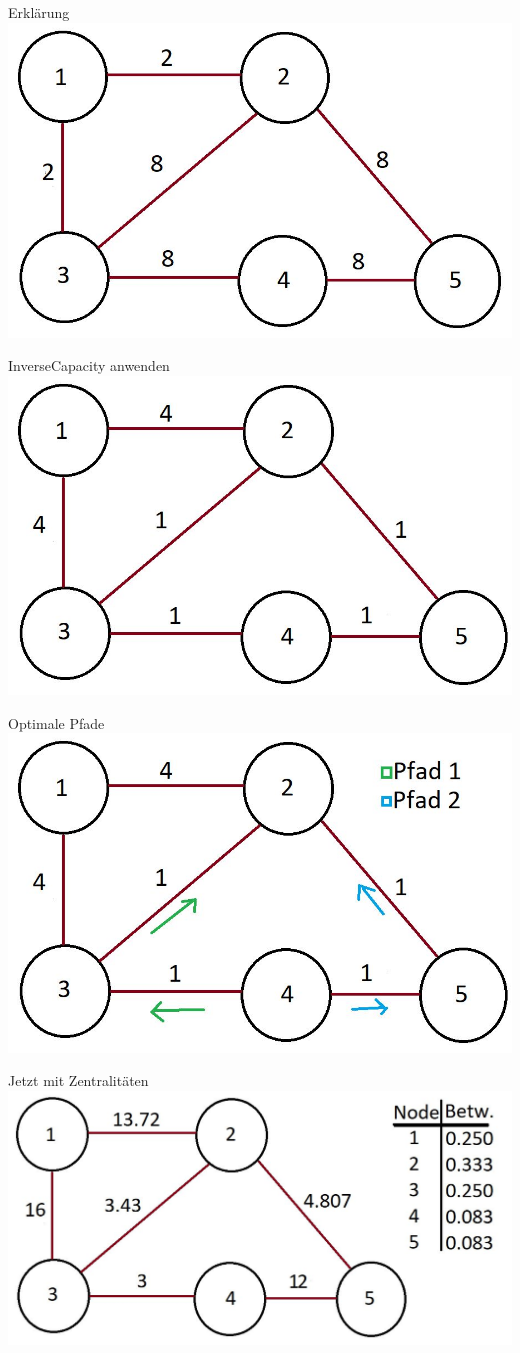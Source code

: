 \documentclass[aspectratio=169,10pt]{beamer}
\begin{document}
\begin{frame}[fragile]{Erkl\"arung}
\includegraphics[width=.7\textwidth]{images/kai_1.jpg}
\end{frame}
\begin{frame}[fragile]{InverseCapacity anwenden}
\includegraphics[width=.7\textwidth]{images/kai_2.jpg}
\end{frame}
\begin{frame}[fragile]{Optimale Pfade}
\includegraphics[width=.7\textwidth]{images/kai_3.jpg}
\end{frame}
\begin{frame}[fragile]{Jetzt mit Zentralit\"aten}
\includegraphics[width=.7\textwidth]{images/kai_4.jpg}
\end{frame}
\end{document}

